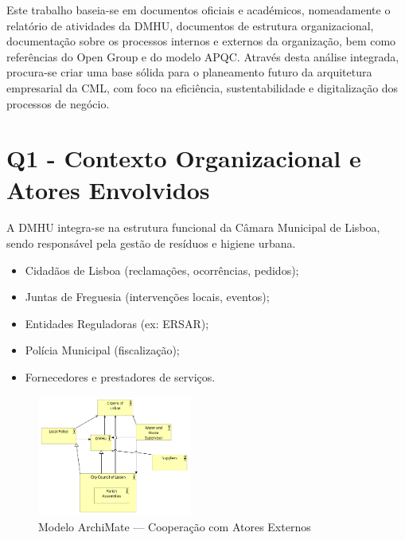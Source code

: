 \documentclass[12pt,a4paper,final]{article}
\begin{document}
    Este trabalho baseia-se em documentos oficiais e académicos, nomeadamente o relatório de atividades da DMHU, documentos de estrutura organizacional, documentação sobre os processos internos e externos da organização, bem como referências do Open Group e do modelo APQC. Através desta análise integrada, procura-se criar uma base sólida para o planeamento futuro da arquitetura empresarial da CML, com foco na eficiência, sustentabilidade e digitalização dos processos de negócio.


    \section*{Q1 - Contexto Organizacional e Atores Envolvidos}\label{sec:contexto-organizacional-e-atores-envolvidos}
    A DMHU integra-se na estrutura funcional da Câmara Municipal de Lisboa, sendo responsável pela gestão de resíduos e higiene urbana.
    \begin{itemize}
        \item Cidadãos de Lisboa (reclamações, ocorrências, pedidos);
        \item Juntas de Freguesia (intervenções locais, eventos);
        \item Entidades Reguladoras (ex: ERSAR);
        \item Polícia Municipal (fiscalização);
        \item Fornecedores e prestadores de serviços.
    \end{itemize}

    \begin{figure}[H]
        \centering
        \includegraphics[width=0.45\textwidth]{Q1 - DHMU Context}
        \caption{Modelo ArchiMate — Cooperação com Atores Externos}
        \label{fig:1}
    \end{figure}
\end{document}
